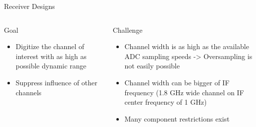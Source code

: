 \documentclass{beamer}
\begin{document}
\begin{frame}{Receiver Designs}
  \begin{columns}[T]
    \begin{column}{.5\textwidth}
      \begin{block}{Goal}
        \begin{itemize}
        \item Digitize the channel of interest with as high as possible
          dynamic range
        \item Suppress influence of other channels
        \end{itemize}
      \end{block}
    \end{column}
    \begin{column}{.5\textwidth}
      \begin{block}{Challenge}
        \begin{itemize}
        \item Channel width is as high as the available ADC sampling
          speeds -> Oversampling is not easily possible
        \item
          Channel width can be bigger of IF frequency
          (1.8 GHz wide channel on IF center frequency of 1 GHz)
        \item Many component restrictions exist
        \end{itemize}
      \end{block}
    \end{column}
  \end{columns}
\end{frame}
\end{document}
